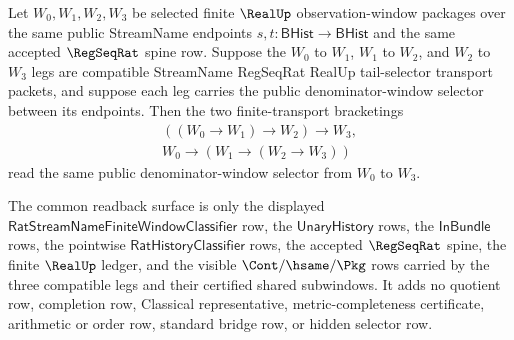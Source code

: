 \begin{theorem}
\label{thm:streamname-regseqrat-realup-tail-selector-associative-readback}
Let $W_0,W_1,W_2,W_3$ be selected finite $\RealUp$ observation-window
packages over the same public StreamName endpoints
$s,t:\mathsf{BHist}\to\mathsf{BHist}$ and the same accepted $\RegSeqRat$
spine row. Suppose the $W_0$ to $W_1$, $W_1$ to $W_2$, and $W_2$ to $W_3$
legs are compatible StreamName RegSeqRat RealUp tail-selector transport
packets, and suppose each leg carries the public denominator-window selector
between its endpoints. Then the two finite-transport bracketings
$$
\begin{gathered}
((W_0\to W_1)\to W_2)\to W_3,\\
W_0\to (W_1\to (W_2\to W_3))
\end{gathered}
$$
read the same public denominator-window selector from $W_0$ to $W_3$.

The common readback surface is only the displayed
$\mathsf{RatStreamNameFiniteWindowClassifier}$ row, the
$\mathsf{UnaryHistory}$ rows, the $\mathsf{InBundle}$ rows, the pointwise
$\mathsf{RatHistoryClassifier}$ rows, the accepted $\RegSeqRat$ spine, the
finite $\RealUp$ ledger, and the visible $\Cont/\hsame/\Pkg$ rows carried by
the three compatible legs and their certified shared subwindows. It adds no
quotient row, completion row, Classical representative, metric-completeness
certificate, arithmetic or order row, standard bridge row, or hidden selector
row.
\end{theorem}
